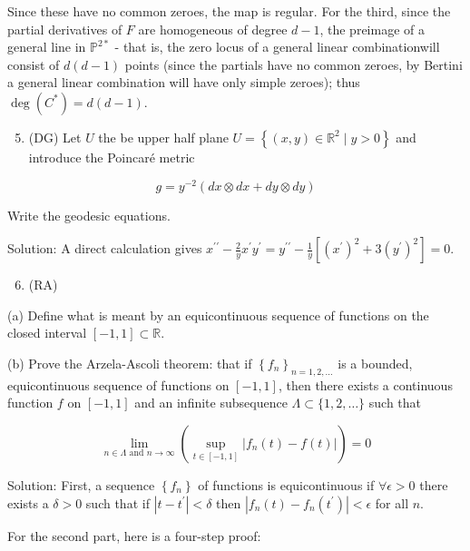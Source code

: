 \documentclass[10pt]{article}
\begin{document}
Since these have no common zeroes, the map is regular. For the third, since the partial derivatives of $F$ are homogeneous of degree $d-1$, the preimage of a general line in $\mathbb{P}^{2 *}$ - that is, the zero locus of a general linear combinationwill consist of $d(d-1)$ points (since the partials have no common zeroes, by Bertini a general linear combination will have only simple zeroes); thus $\operatorname{deg}\left(C^{*}\right)=d(d-1)$.

\begin{enumerate}
  \setcounter{enumi}{4}
  \item (DG) Let $U$ the be upper half plane $U=\left\{(x, y) \in \mathbb{R}^{2} \mid y>0\right\}$ and introduce the Poincaré metric
\end{enumerate}

$$
g=y^{-2}(d x \otimes d x+d y \otimes d y)
$$

Write the geodesic equations.

Solution: A direct calculation gives $x^{\prime \prime}-\frac{2}{y} x^{\prime} y^{\prime}=y^{\prime \prime}-\frac{1}{y}\left[\left(x^{\prime}\right)^{2}+3\left(y^{\prime}\right)^{2}\right]=0$.

\begin{enumerate}
  \setcounter{enumi}{5}
  \item (RA)
\end{enumerate}

(a) Define what is meant by an equicontinuous sequence of functions on the closed interval $[-1,1] \subset \mathbb{R}$.

(b) Prove the Arzela-Ascoli theorem: that if $\left\{f_{n}\right\}_{n=1,2, \ldots}$ is a bounded, equicontinuous sequence of functions on $[-1,1]$, then there exists a continuous function $f$ on $[-1,1]$ and an infinite subsequence $\Lambda \subset\{1,2, \ldots\}$ such that

$$
\lim _{n \in \Lambda \text { and } n \rightarrow \infty}\left(\sup _{t \in[-1,1]}\left|f_{n}(t)-f(t)\right|\right)=0
$$

Solution: First, a sequence $\left\{f_{n}\right\}$ of functions is equicontinuous if $\forall \epsilon>0$ there exists a $\delta>0$ such that if $\left|t-t^{\prime}\right|<\delta$ then $\left|f_{n}(t)-f_{n}\left(t^{\prime}\right)\right|<\epsilon$ for all $n$.

For the second part, here is a four-step proof:
\end{document}
